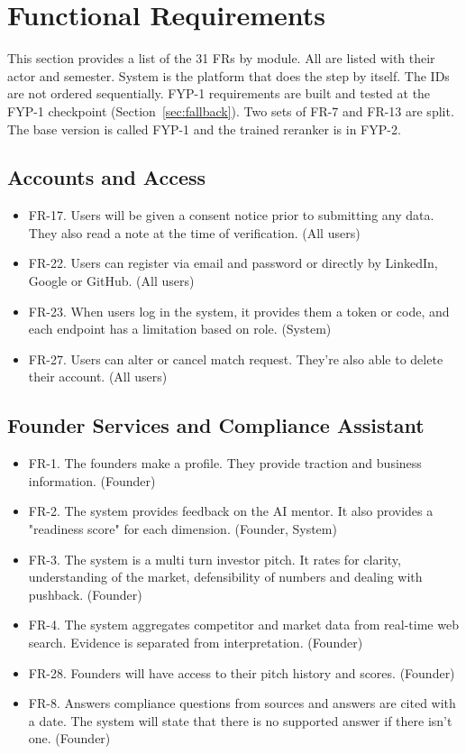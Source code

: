 \documentclass{FastFyp}
\begin{document}
\section{Functional Requirements}\label{sec:fr}
This section provides a list of the 31 FRs by module. All are listed with their actor and semester. System is the platform that does the step by itself. The IDs are not ordered sequentially. FYP-1 requirements are built and tested at the FYP-1 checkpoint (Section~\ref{sec:fallback}). Two sets of FR-7 and FR-13 are split. The base version is called FYP-1 and the trained reranker is in FYP-2.

\subsection{Accounts and Access}
\begin{itemize}
\item FR-17. Users will be given a consent notice prior to submitting any data. They also read a note at the time of verification. (All users)
\item FR-22. Users can register via email and password or directly by LinkedIn, Google or GitHub. (All users)
\item FR-23. When users log in the system, it provides them a token or code, and each endpoint has a limitation based on role. (System)
\item FR-27. Users can alter or cancel match request. They're also able to delete their account. (All users)
\end{itemize}

\subsection{Founder Services and Compliance Assistant}
\begin{itemize}
\item FR-1. The founders make a profile. They provide traction and business information. (Founder)
\item FR-2. The system provides feedback on the AI mentor. It also provides a "readiness score" for each dimension. (Founder, System)
\item FR-3. The system is a multi turn investor pitch. It rates for clarity, understanding of the market, defensibility of numbers and dealing with pushback. (Founder)
\item FR-4. The system aggregates competitor and market data from real-time web search. Evidence is separated from interpretation. (Founder)
\item FR-28. Founders will have access to their pitch history and scores. (Founder)
\item FR-8. Answers compliance questions from sources and answers are cited with a date. The system will state that there is no supported answer if there isn't one. (Founder)
\end{itemize}
\end{document}
